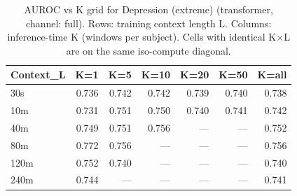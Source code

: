 \begin{table}[ht]
\centering
\caption{AUROC vs K grid for Depression (extreme) (transformer, channel: full). Rows: training context length L. Columns: inference-time K (windows per subject). Cells with identical K×L are on the same iso-compute diagonal.}
\label{tab:kgrid_depression_extreme_binary_transformer_full}
\begin{tabular}{lrrrrrr}
\toprule
Context_L & K=1 & K=5 & K=10 & K=20 & K=50 & K=all \\
\midrule
30s & 0.736 & 0.742 & 0.742 & 0.739 & 0.740 & 0.738 \\
10m & 0.731 & 0.751 & 0.750 & 0.740 & 0.741 & 0.742 \\
40m & 0.749 & 0.751 & 0.756 & — & — & 0.752 \\
80m & 0.772 & 0.756 & — & — & — & 0.756 \\
120m & 0.752 & 0.740 & — & — & — & 0.740 \\
240m & 0.744 & — & — & — & — & 0.741 \\
\bottomrule
\end{tabular}
\end{table}